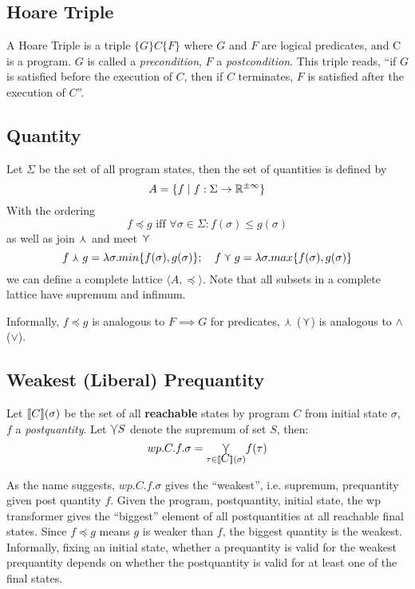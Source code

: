\documentclass[adraft,hidelinks]{eptcs}
\begin{document}
\subsection{Hoare Triple}
A Hoare Triple is a triple $ \{G\} C \{F\}$ where $G$ and $F$ are logical predicates, and C is a program. 
$G$ is called a \textit{precondition}, $F$ a \textit{postcondition}. 
This triple reads, ``if $G$ is satisfied before the execution of $C$, then if $C$ terminates, $F$ is satisfied after the execution of $C$''. 

\subsection{Quantity}
Let $\Sigma$ be the set of all program states, then the set of quantities is defined by 
\[A=\{f\mid f:\Sigma\to\mathbb{R}^{\pm\infty}\}\] 
With the ordering 
\[f\preceq g \text{ iff } \forall \sigma \in \Sigma: f(\sigma)\leq g(\sigma)\]
as well as join $\curlywedge$ and meet $\curlyvee$
\[f\curlywedge g = \lambda \sigma.min\{f(\sigma), g(\sigma)\}; \ \ \  f\curlyvee g = \lambda \sigma.max\{f(\sigma), g(\sigma) \}\]
we can define a complete lattice $\langle A, \preceq\rangle$. 
Note that all subsets in a complete lattice have supremum and infimum. 

Informally, $f\preceq g$ is analogous to $F\implies G$ for predicates, $\curlywedge$ ($\curlyvee$) is analogous to $\wedge$ ($\vee$). 

\subsection{Weakest (Liberal) Prequantity}
Let $\bkt C (\sigma)$ be the set of all \textbf{reachable} states by program $C$ from initial state $\sigma$, $f$ a \textit{postquantity}. 
Let $\varcurlyvee S$ denote the supremum of set $S$, then: 
\[wp.C.f.\sigma = \underset{\tau\in\bkt C(\sigma)}{\bigmeet} f(\tau)\]

As the name suggests, $wp.C.f.\sigma$ gives the ``weakest'', i.e. supremum, prequantity given post quantity $f$. 
Given the program, postquantity, initial state, the wp transformer gives the ``biggest'' element of all postquantities at all reachable final states. 
Since $f\preceq g$ means $g$ is weaker than $f$, the biggest quantity is the weakest. 
Informally, fixing an initial state, whether a prequantity is valid for the weakest prequantity depends on whether the postquantity is valid for at least one of the final states. 
\begin{comment}
Note that supremum can be not an element of the infinite set.
\end{comment}
\end{document}

